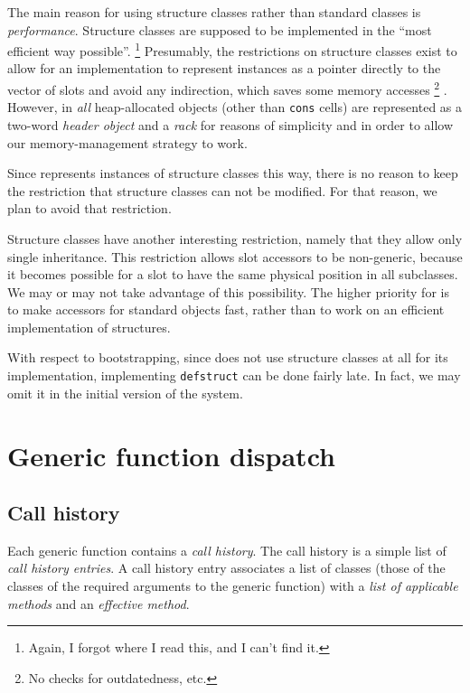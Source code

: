 The main reason for using structure classes rather than standard
classes is \emph{performance}.  Structure classes are supposed to be
implemented in the ``most efficient way possible''.%
\footnote{Again, I forgot where I read this, and I can't find it.}
Presumably, the restrictions on structure classes exist to allow for
an implementation to represent instances as a pointer directly to the
vector of slots and avoid any indirection, which saves some memory
accesses%
  \footnote{No checks for outdatedness, etc.}
.  However, in \sysname{} \emph{all} heap-allocated objects
(other than \texttt{cons} cells) are represented as a two-word
\emph{header object} and a \emph{rack} for reasons of
simplicity and in order to allow our memory-management strategy to
work.

Since \sysname{} represents instances of structure classes this way,
there is no reason to keep the restriction that structure classes can
not be modified.  For that reason, we plan to avoid that restriction.

Structure classes have another interesting restriction, namely that
they allow only single inheritance.  This restriction allows slot
accessors to be non-generic, because it becomes possible for a slot to
have the same physical position in all subclasses.  We may or may not
take advantage of this possibility.  The higher priority for
\sysname{} is to make accessors for standard objects fast, rather than
to work on an efficient implementation of structures. 

With respect to bootstrapping, since \sysname{} does not use structure
classes at all for its implementation, implementing \texttt{defstruct}
can be done fairly late.  In fact, we may omit it in the initial version
of the system. 

\section{Generic function dispatch}
\label{sec-generic-function-dispatch}

\subsection{Call history}
\label{sec-generic-function-dispatch-call-history}

Each generic function contains a \emph{call history}.  The call
history is a simple list of \emph{call history entries}.  A call
history entry associates a list of classes (those of the classes of
the required arguments to the generic function) with a \emph{list of
  applicable methods} and an \emph{effective method}.


